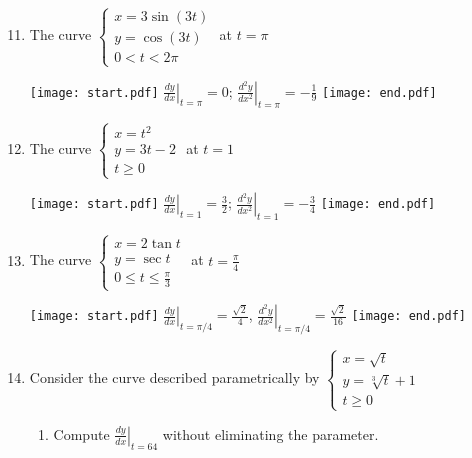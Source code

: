 \documentclass[12pt]{article}
\begin{document}

\begin{enumerate}
\setcounter{enumi}{10}

\item The curve $\left\{\begin{array}{l}
x=3\sin{(3t)}\\
y=\cos{(3t)}\\
0<t<2\pi\end{array}\right.$ at $t=\pi$ 

\texttt{[image: start.pdf]}
{{$\left.\frac{dy}{dx}\right|_{t=\pi}=0$; $\left.\frac{d^2y}{dx^2}\right|_{t=\pi}=-\frac{1}{9}$}}
\texttt{[image: end.pdf]}


\item The curve $\left\{\begin{array}{l}
x=t^2\\
y=3t-2\\
t \geq 0 \end{array}\right.$ at $t=1$ 

\texttt{[image: start.pdf]}
{{$\left.\frac{dy}{dx}\right|_{t=1}=\frac{3}{2}$; $\left.\frac{d^2y}{dx^2}\right|_{t=1}=-\frac{3}{4}$}}
\texttt{[image: end.pdf]}


\item The curve $\left\{\begin{array}{l}
x=2\tan{t}\\
y=\sec{t}\\
0 \leq t \leq \frac{\pi}{3} \end{array}\right.$ at $t=\frac{\pi}{4}$ 

\texttt{[image: start.pdf]}
{{$\left.\frac{dy}{dx}\right|_{t=\pi/4}=\frac{\sqrt{2}}{4}$, $\left.\frac{d^2y}{dx^2}\right|_{t=\pi/4}=\frac{\sqrt{2}}{16}$}}
\texttt{[image: end.pdf]}


\item Consider the curve described parametrically by $\left\{\begin{array}{l}
x=\sqrt{t}\\
y=\sqrt[3]{t}+1\\
t \geq 0 \end{array}\right.$

\begin{enumerate}

\item Compute $\left.\frac{dy}{dx}\right|_{t=64}$ without eliminating the parameter.


\end{enumerate}
\end{enumerate}
\end{document}
